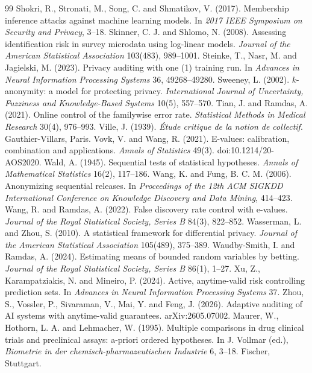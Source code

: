 \documentclass{jpc}
\theoremstyle{remark}
\begin{document}
\begin{thebibliography}{99}
 Shokri, R., Stronati, M., Song, C. and Shmatikov, V. (2017). Membership inference attacks against machine learning models. In \emph{2017 IEEE Symposium on Security and Privacy}, 3--18.
 Skinner, C. J. and Shlomo, N. (2008). Assessing identification risk in survey microdata using log-linear models. \emph{Journal of the American Statistical Association} 103(483), 989--1001.
 Steinke, T., Nasr, M. and Jagielski, M. (2023). Privacy auditing with one (1) training run. In \emph{Advances in Neural Information Processing Systems} 36, 49268--49280.
 Sweeney, L. (2002). $k$-anonymity: a model for protecting privacy. \emph{International Journal of Uncertainty, Fuzziness and Knowledge-Based Systems} 10(5), 557--570.
 Tian, J. and Ramdas, A. (2021). Online control of the familywise error rate. \emph{Statistical Methods in Medical Research} 30(4), 976--993.
 Ville, J. (1939). \emph{\'Etude critique de la notion de collectif}. Gauthier-Villars, Paris.
 Vovk, V. and Wang, R. (2021). E-values: calibration, combination and applications. \emph{Annals of Statistics} 49(3). doi:10.1214/20-AOS2020.
 Wald, A. (1945). Sequential tests of statistical hypotheses. \emph{Annals of Mathematical Statistics} 16(2), 117--186.
 Wang, K. and Fung, B. C. M. (2006). Anonymizing sequential releases. In \emph{Proceedings of the 12th ACM SIGKDD International Conference on Knowledge Discovery and Data Mining}, 414--423.
 Wang, R. and Ramdas, A. (2022). False discovery rate control with e-values. \emph{Journal of the Royal Statistical Society, Series B} 84(3), 822--852.
 Wasserman, L. and Zhou, S. (2010). A statistical framework for differential privacy. \emph{Journal of the American Statistical Association} 105(489), 375--389.
 Waudby-Smith, I. and Ramdas, A. (2024). Estimating means of bounded random variables by betting. \emph{Journal of the Royal Statistical Society, Series B} 86(1), 1--27.
 Xu, Z., Karampatziakis, N. and Mineiro, P. (2024). Active, anytime-valid risk controlling prediction sets. In \emph{Advances in Neural Information Processing Systems} 37.
 Zhou, S., Vossler, P., Sivaraman, V., Mai, Y. and Feng, J. (2026). Adaptive auditing of AI systems with anytime-valid guarantees. arXiv:2605.07002.
 Maurer, W., Hothorn, L. A. and Lehmacher, W. (1995). Multiple comparisons in drug clinical trials and preclinical assays: a-priori ordered hypotheses. In J. Vollmar (ed.), \emph{Biometrie in der chemisch-pharmazeutischen Industrie} 6, 3--18. Fischer, Stuttgart.

\end{thebibliography}
\end{document}

